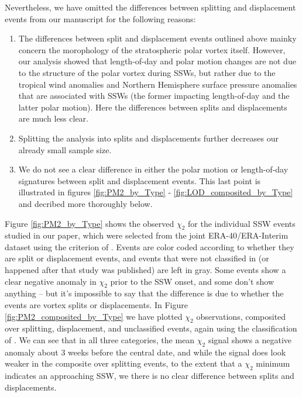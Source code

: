 \documentclass[a4paper,10pt]{article}
\begin{document}
Nevertheless, we have omitted the differences between splitting and displacement events from our manuscript for the following reasons:
\begin{enumerate}
  \item The differences between split and displacement events outlined above mainky concern the morophology of the stratospheric polar vortex itself.  However, our analysis showed that length-of-day and polar motion changes are not due to the structure of the polar vortex during SSWs, but rather due to the tropical wind anomalies and Northern Hemisphere surface pressure anomalies  that are associated with SSWs (the former impacting length-of-day and the latter polar motion).  Here the differences between splits and displacements are much less clear.
 \item Splitting the analysis into splits and displacements further decreases our already small sample size.  
 \item We do not see a clear difference in either the polar motion or length-of-day signatures between split and displacement events.   This last point is illustrated in figures \ref{fig:PM2_by_Type} - \ref{fig:LOD_composited_by_Type} and decribed more thoroughly below.  
\end{enumerate}

Figure \ref{fig:PM2_by_Type} shows the observed $\chi_2$ for the individual SSW events studied in our paper, which were selected from the joint ERA-40/ERA-Interim dataset using the criterion of \citet{Charlton2007}.
Events are color coded according to whether they are split or displacement events, and events that were not classified in \citet{Charlton2007} (or happened after that study was published) are left in gray.
Some events show a clear negative anomaly in $\chi_2$ prior to the SSW onset, and some don't show anything -- but it's impossible to say that the difference is due to whether the events are vortex splits or displacements.  
%
In Figure \ref{fig:PM2_composited_by_Type} we have plotted $\chi_2$ observations, composited over splitting, displacement, and unclassified events, again using the classification of \citet{Charlton2007}.
We can see that in all three categories, the mean $\chi_2$ signal shows a negative anomaly about 3 weeks before the central date, and while the signal does look weaker in the composite over splitting events, to the extent that a $\chi_2$ minimum indicates an approaching SSW, we there is no clear difference between splits and displacements.
\end{document}
